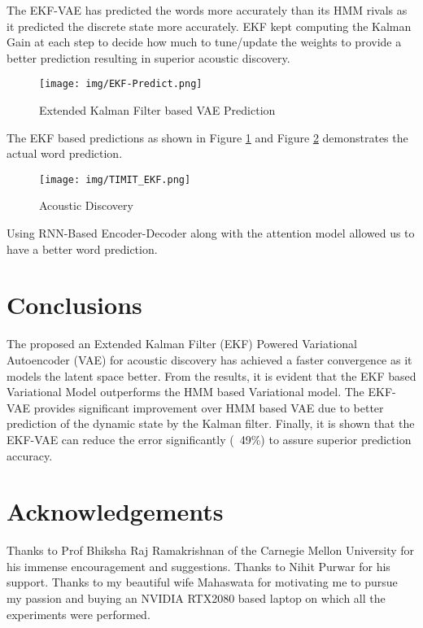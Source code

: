 \documentclass{article}
\begin{document}
The EKF-VAE has predicted the words more accurately than its HMM rivals as it predicted the discrete state more accurately. EKF kept computing the Kalman Gain at each step to decide how much to tune/update the weights to provide a better prediction resulting in superior acoustic discovery. 

\begin{figure}[H]
  \centering
  \texttt{[image: img/EKF-Predict.png]}
  \caption{ Extended Kalman Filter based VAE Prediction}
  \label{fig:fig10}
\end{figure}
The EKF based predictions as shown in Figure \ref{fig:fig10} and Figure \ref{fig:fig11} demonstrates the actual word prediction.
\begin{figure}[H]
  \centering
  \texttt{[image: img/TIMIT\_EKF.png]}
  \caption{Acoustic Discovery}
  \label{fig:fig11}
\end{figure}
Using RNN-Based Encoder-Decoder along with the attention model allowed us to have a better word prediction.  

\section{Conclusions}
\label{section:conclusions}
The proposed an Extended Kalman Filter (EKF) Powered Variational Autoencoder (VAE) for acoustic discovery has achieved a faster convergence as it models the latent space better. From the results, it is evident that the EKF based Variational Model outperforms the HMM based Variational model. The EKF-VAE provides significant improvement over HMM based VAE due to better prediction of the dynamic state by the Kalman filter. Finally, it is shown that the EKF-VAE can reduce the error significantly (~49\%) to assure superior prediction accuracy.

\section{Acknowledgements}
Thanks to Prof Bhiksha Raj Ramakrishnan of the Carnegie Mellon University for his immense encouragement and suggestions. Thanks to Nihit Purwar for his support. Thanks to my beautiful wife Mahaswata for motivating me to pursue my passion and buying an NVIDIA RTX2080 based laptop on which all the experiments were performed.

\normalsize



\end{document}
